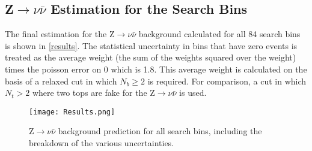 \subsection{Z$\rightarrow\nu\bar{\nu}$ Estimation for the Search Bins}

The final estimation for the Z$\rightarrow\nu\bar{\nu}$ background calculated for all 84 search bins is shown in \autoref{results}. The statistical uncertainty in bins that have zero events is treated as the average weight (the sum of the weights squared over the weight) times the poisson error on 0 which is 1.8. This average weight is calculated on the basis of a relaxed cut in which $N_b \geq 2$ is required. For comparison, a cut in which $N_t > 2$ where two tops are fake for the Z$\rightarrow\nu\bar{\nu}$ is used.

\begin{figure}[H]
\begin{center}
\texttt{[image: Results.png]}
\end{center}
\vspace{-1em}
\caption{Z$\rightarrow\nu\bar{\nu}$ background prediction for all search bins, including the breakdown of the various uncertainties.}
\label{results}
\end{figure}

